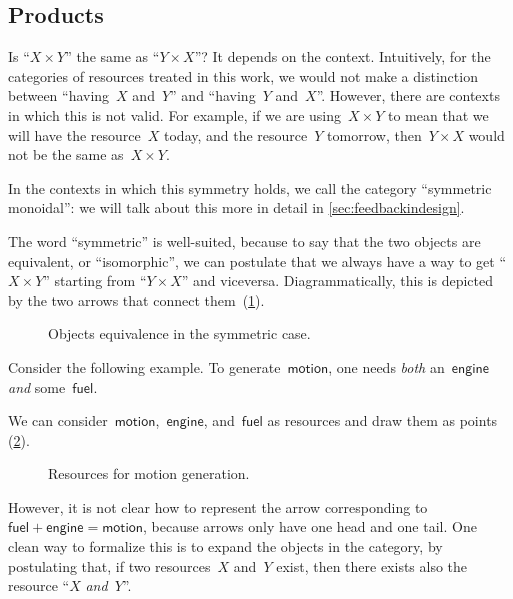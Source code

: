 \label{sec:productset}
\subsection{Products}
Is ``$X \times Y$'' the same as ``$Y \times X$''?
It depends on the context. Intuitively, for the categories of resources treated in this work, we would not make a distinction between ``having~$X$ and~$Y$'' and ``having~$Y$ and~$X$''.
However, there are contexts in which this is not valid. For example, if we are
using~$X \times Y$ to mean that we will have the resource~$X$ today, and the
resource~$Y$ tomorrow, then~$Y \times X$ would not be the same as~$X \times Y$. 

In the contexts in which this symmetry holds, we call the category ``symmetric monoidal'': we will talk about this more in detail in \cref{sec:feedbackindesign}.

The word ``symmetric'' is well-suited, because to say that the two objects are equivalent, or ``isomorphic'', we can postulate that we always have a way to get
``$X \times Y$'' starting from ``$Y \times X$'' and viceversa. Diagrammatically, this is depicted by the two arrows that connect them~(\cref{fig:e17}).

\begin{figure}[h!]
    \centering
    \caption{Objects equivalence in the symmetric case. \label{fig:e17}}
\end{figure}

Consider the following example. To generate~$\mathsf{motion}$, one needs \emph{both} an~$\mathsf{engine}$ \emph{and} some~$\mathsf{fuel}$.

We can consider~$\mathsf{motion}$,~$\mathsf{engine}$, and~$\mathsf{fuel}$ as resources and draw them as points (\cref{fig:e11}).

\begin{figure}[h!]
    \centering
    \caption{Resources for motion generation. \label{fig:e11}}
\end{figure}

However, it is not clear how to represent the arrow corresponding to~$\mathsf{fuel} + \mathsf{engine} = \mathsf{motion}$, because arrows only have one head and one tail.
One clean way to formalize this is to expand the objects in the category, by postulating that, if two resources~$X$ and~$Y$ exist, then there exists also the resource ``$X$ \emph{and}~$Y$''.


